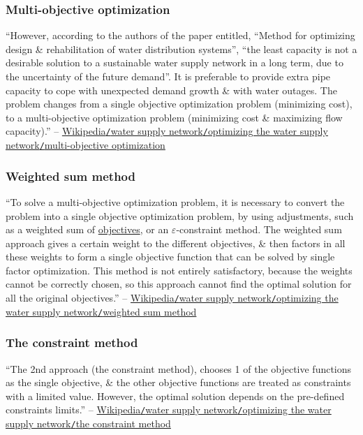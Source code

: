 \documentclass[oneside]{book}
\numberwithin{equation}{section}
\begin{document}
\subsubsection{Multi-objective optimization}
``However, according to the authors of the paper entitled, ``Method for optimizing design \& rehabilitation of water distribution systems'', ``the least capacity is not a desirable solution to a sustainable water supply network in a long term, due to the uncertainty of the future demand''. It is preferable to provide extra pipe capacity to cope with unexpected demand growth \& with water outages. The problem changes from a single objective optimization problem (minimizing cost), to a multi-objective optimization problem (minimizing cost \& maximizing flow capacity).'' -- \href{https://en.wikipedia.org/wiki/Water_supply_network#Multi-objective_optimization}{Wikipedia\texttt{/}water supply network\texttt{/}optimizing the water supply network\texttt{/}multi-objective optimization}

\subsubsection{Weighted sum method}
``To solve a multi-objective optimization problem, it is necessary to convert the problem into a single objective optimization problem, by using adjustments, such as a weighted sum of \href{https://en.wikipedia.org/wiki/Goal}{objectives}, or an $\varepsilon$-constraint method. The weighted sum approach gives a certain weight to the different objectives, \& then factors in all these weights to form a single objective function that can be solved by single factor optimization. This method is not entirely satisfactory, because the weights cannot be correctly chosen, so this approach cannot find the optimal solution for all the original objectives.'' -- \href{https://en.wikipedia.org/wiki/Water_supply_network#Weighted_sum_method}{Wikipedia\texttt{/}water supply network\texttt{/}optimizing the water supply network\texttt{/}weighted sum method}

\subsubsection{The constraint method}
``The 2nd approach (the constraint method), chooses 1 of the objective functions as the single objective, \& the other objective functions are treated as constraints with a limited value. However, the optimal solution depends on the pre-defined constraints limits.'' -- \href{https://en.wikipedia.org/wiki/Water_supply_network#The_constraint_method}{Wikipedia\texttt{/}water supply network\texttt{/}optimizing the water supply network\texttt{/}the constraint method}
\end{document}
